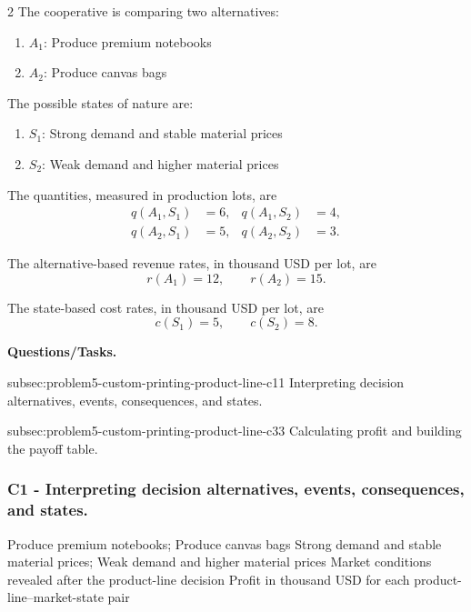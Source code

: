 \begin{multicols}{2}
	The cooperative is comparing two alternatives:
	\begin{enumerate}[label=\arabic*.]
		\item \(A_1\): Produce premium notebooks
		\item \(A_2\): Produce canvas bags
	\end{enumerate}
	
	The possible states of nature are:
	\begin{enumerate}[label=\arabic*.]
		\item \(S_1\): Strong demand and stable material prices
		\item \(S_2\): Weak demand and higher material prices
	\end{enumerate}
	
	\columnbreak
	
	The quantities, measured in production lots, are
	\[
	\begin{aligned}
		q(A_1,S_1)&=6,
		&
		q(A_1,S_2)&=4,
		\\
		q(A_2,S_1)&=5,
		&
		q(A_2,S_2)&=3.
	\end{aligned}
	\]
	
	The alternative-based revenue rates, in thousand USD per lot, are
	\[
	r(A_1)=12,
	\qquad
	r(A_2)=15.
	\]
	
	The state-based cost rates, in thousand USD per lot, are
	\[
	c(S_1)=5,
	\qquad
	c(S_2)=8.
	\]
\end{multicols}

\textbf{Questions/Tasks.}
\begin{enumerate}
	\CriterionTask
	{subsec:problem5-custom-printing-product-line-c1}{1}
	{Interpreting decision alternatives, events, consequences, and states.}

	\CriterionTask
	{subsec:problem5-custom-printing-product-line-c3}{3}
	{Calculating profit and building the payoff table.}
\end{enumerate}

\subsubsection*{C1 - Interpreting decision alternatives, events, consequences, and states.}
\label{subsec:problem5-custom-printing-product-line-c1}

\DecisionElementsTable
{Produce premium notebooks; Produce canvas bags}
{Strong demand and stable material prices; Weak demand and higher material prices}
{Market conditions revealed after the product-line decision}
{Profit in thousand USD for each product-line--market-state pair}

